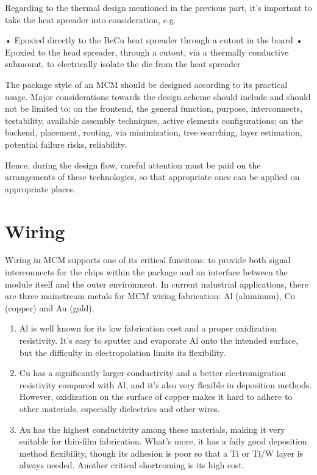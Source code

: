 \begin{spacing}{1.5}
Regarding to the thermal design mentioned in the previous part, it's important to take the heat spreader into consideration, e.g.

• Epoxied directly to the BeCu heat spreader through a cutout in the board
• Epoxied to the head spreader, through a cutout, via a thermally conductive submount, to electrically isolate the die from the heat spreader

The package style of an MCM should be designed according to its practical usage. Major considerations towards the design scheme should include and should not be limited to: on the frontend, the general function, purpose, interconnects, testability, available assembly techniques, active elements configurations; on the backend, placement, routing, via minimization, tree searching, layer estimation, potential failure risks, reliability. 

Hence, during the design flow, careful attention must be paid on the arrangements of these technologies, so that appropriate ones can be applied on appropriate places. \cite{chen2006vlsi} 


\section{Wiring}

Wiring in MCM supports one of its critical funcitons: to provide both signal interconnects for the chips within the package and an interface between the module itself and the outer environment. In current industrial applications, there are three mainstream metals for MCM wiring fabrication: Al (aluminum), Cu (copper) and Au (gold). 

\begin{enumerate}
    \item Al is well known for its low fabrication cost and a proper oxidization resistivity. It's easy to sputter and evaporate Al onto the intended surface, but the difficulty in electropolation limits its flexibility. 
    \item Cu has a significantly larger conductivity and a better electromigration resistivity compared with Al, and it's also very flexible in deposition methods. However, oxidization on the surface of copper makes it hard to adhere to other materials, especially dielectrics and other wires. 
    \item Au has the highest conductivity among these materials, making it very suitable for thin-film fabrication. What's more, it has a faily good deposition method flexibility, though its adhesion is poor so that a Ti or Ti/W layer is always needed. Another critical shortcoming is its high cost. 
\end{enumerate} 


\end{spacing}
